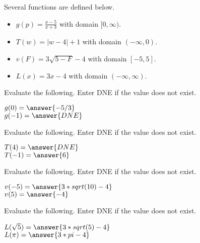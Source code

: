 \documentclass{ximera}
\begin{document}
\begin{definition}
Several functions are defined below.
\begin{itemize}
\item $g(p) = \frac{x-5}{x+3}$ with domain $[0, \infty)$. \\ \quad
\item $T(w) = | w - 4 | + 1$ with domain $(-\infty, 0)$. 
\item $v(F) = 3\sqrt{5 - F} - 4$ with domain $[-5, 5]$. 
\item $L(x) = 3x - 4$ with domain $(-\infty, \infty)$. 
\end{itemize}
\end{definition}



\begin{exercise}
Evaluate the following.  Enter DNE if the value does not exist.

$g(0) = \answer{-5/3}$  \\
$g(-1) = \answer{DNE}$

\end{exercise}




\begin{exercise}
Evaluate the following.  Enter DNE if the value does not exist.

$T(4) = \answer{DNE}$  \\
$T(-1) = \answer{6}$

\end{exercise}




\begin{exercise}
Evaluate the following.  Enter DNE if the value does not exist.

$v(-5) = \answer{3 * sqrt(10) - 4}$  \\
$v(5) = \answer{-4}$

\end{exercise}



\begin{exercise}
Evaluate the following.  Enter DNE if the value does not exist.

$L(\sqrt{5}) = \answer{3 * sqrt(5) - 4}$  \\
$L(\pi) = \answer{3 * pi - 4}$

\end{exercise}
\end{document}
